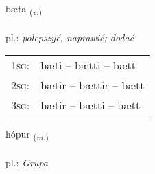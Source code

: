 \documentclass[frontgrid, backgrid]{flacards}\usepackage[]{graphicx}\usepackage[]{xcolor}
\begin{document}
\renewcommand{\flhead}{\vskip5pt \fboxsep=0pt {\small\bfseries\footnotesize Sagnorð | czasownik}}
\renewcommand{\fcfoot}{\vskip5pt \fboxsep=0pt \hspace{2pt}{\small\bfseries\footnotesize 1K}}

\renewcommand{\blhead}{\vskip5pt {\small\bfseries\footnotesize Sagnorð | czasownik }}
\renewcommand{\bcfoot}{\vskip5pt \hspace{2pt}{\small\bfseries\footnotesize 1K}}


{bæta \small{\textsubscript{(\textit{v.})}} \\[1ex] %
\textphonetic{[paiːta]} \\
pl.: \emph{polepszyć, naprawić; dodać} \\  [2ex]
\renewcommand*{\arraystretch}{0.8}
\begin{tabular}{p{1cm}l}
\textsc{1sg}: & bæti -- bætti -- bætt \\ 
\textsc{2sg}: & bætir -- bættir -- bætt \\ 
\textsc{3sg}: & bætir -- bætti -- bætt \\ 
\end{tabular}
}

\renewcommand{\flhead}{\vskip5pt \fboxsep=0pt {\small\bfseries\footnotesize Nafnorð | rzeczownik}}
\renewcommand{\fcfoot}{\vskip5pt \fboxsep=0pt \hspace{2pt}{\small\bfseries\footnotesize 1K}}

\renewcommand{\blhead}{\vskip5pt {\small\bfseries\footnotesize Nafnorð | rzeczownik }}
\renewcommand{\bcfoot}{\vskip5pt \hspace{2pt}{\small\bfseries\footnotesize 1K}}


{hópur \small{\textsubscript{(\textit{m.})}} \\[1ex] %
\textphonetic{[houːpʏr]} \\
pl.: \emph{Grupa} \\  [2ex]
\renewcommand*{\arraystretch}{0.8}
}
\end{document}
